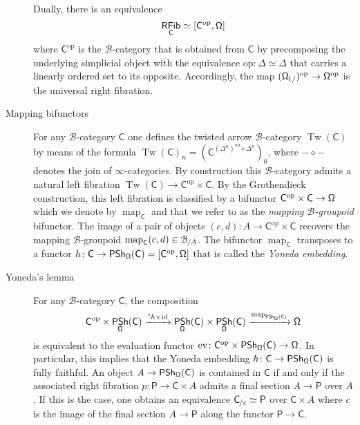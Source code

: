 \documentclass[reqno]{amsart}
\numberwithin{equation}{subsection}
\theoremstyle{plain}
\theoremstyle{definition}
\let\scr=\mathcal
\def\BB{\scr B}
\DeclareMathOperator{\id}{id}
\DeclareMathOperator{\ev}{ev}
\DeclareMathOperator{\IPSh}{\mathsf{PSh}}
\DeclareMathOperator{\IRFib}{\mathsf{RFib}}
\DeclareMathOperator{\Tw}{Tw}
\DeclareMathOperator{\Map}{map}
\newcommand{\op}{\mathrm{op}}
\newcommand{\map}[1]{\Map_{#1}}
\newcommand{\Over}[2]{#1_{\hspace{-1pt}/#2}}
\newcommand{\Under}[2]{#1_{\hspace{-1pt}#2/}}
\newcommand{\I}[1]{\mathsf{#1}}
\newcommand{\iFun}[2]{{[#1,#2]}}
\begin{document}
\begin{description}
    Dually, there is an equivalence
        \begin{equation*}
        \IRFib_{\I{C}}\simeq \iFun{\I{C}^{\op}}{\Univ}
    \end{equation*}
    where $\I{C}^{\op}$ is the $\BB$-category that is obtained from $\I{C}$ by precomposing the underlying simplicial object with the equivalence $\op\colon \Delta\simeq\Delta$ that carries a linearly ordered set to its opposite. Accordingly, the map $(\Under{\Univ}{1})^{\op}\to \Univ^{\op}$ is the universal right fibration.
    
    \item[Mapping bifunctors]
    For any $\BB$-category $\I{C}$ one defines the twisted arrow $\BB$-category $\Tw(\I{C})$ by means of the formula $\Tw(\I{C})_n=(\I{C}^{(\Delta^n)^{\op}\diamond\Delta^n})_0$, where $-\diamond -$ denotes the join of $\infty$-categories. By construction this $\BB$-category admits a natural left fibration $\Tw(\I{C})\to\I{C}^{\op}\times\I{C}$. By the Grothendieck construction, this left fibration is classified by a bifunctor $\I{C}^\op\times\I{C}\to\Univ$ which we denote by $\map{\I{C}}$ and that we refer to as the \emph{mapping $\BB$-groupoid} bifunctor. The image of a pair of objects $(c,d)\colon A\to \I{C}^{\op}\times\I{C}$ recovers the mapping $\BB$-groupoid $\map{\I{C}}(c,d)\in\Over{\BB}{A}$. The bifunctor $\map{\I{C}}$ transposes to a functor $h\colon \I{C}\to \IPSh_{\Univ}(\I{C})=\iFun{\I{C}^{\op}}{\Univ}$ that is called the \emph{Yoneda embedding}.

    \item[Yoneda's lemma]
    For any $\BB$-category $\I{C}$, the composition
    \begin{equation*}
            \I{C}^{\op}\times\IPSh_{\Univ}(\I{C})\xrightarrow{"h\times \id} \IPSh_{\Univ}(\I{C}) \times  \IPSh_{\Univ}(\I{C}) \xrightarrow{\map{\IPSh_{\Univ}(\I{C})}} \Univ
    \end{equation*}
    is equivalent to the evaluation functor $\ev\colon \I{C}^{\op}\times\IPSh_{\Univ}(\I{C})\to\Univ$. In particular, this implies that the Yoneda embedding $h\colon \I{C}\to\IPSh_{\Univ}(\I{C})$ is fully faithful. An object $A\to \IPSh_{\Univ}(\I{C})$ is contained in $\I{C}$ if and only if the associated right fibration $p\colon \I{P}\to \I{C}\times A$ admits a final section $A\to \I{P}$ over $A$. If this is the case, one obtains an equivalence $\Over{\I{C}}{c}\simeq \I{P}$ over $\I{C}\times A$ where $c$ is the image of the final section $A\to \I{P}$ along the functor $\I{P}\to \I{C}$.
    

\end{description}
\end{document}
